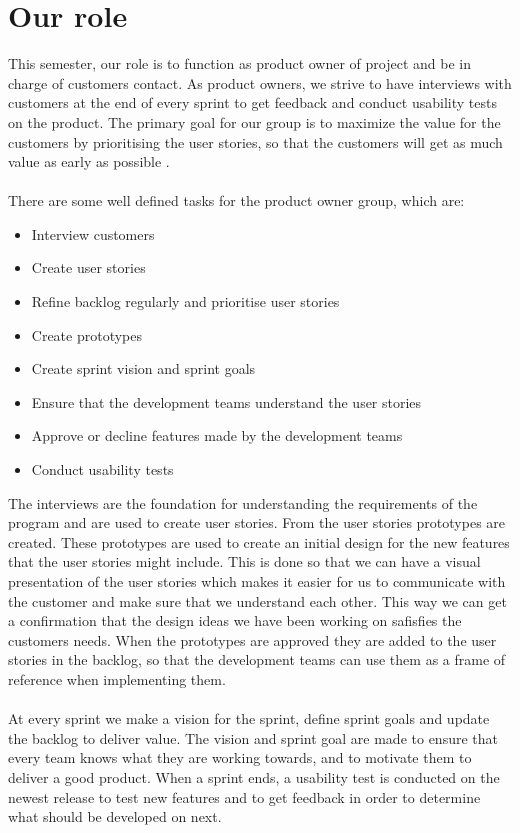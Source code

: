 \section{Our role}
This semester, our role is to function as product owner of project and be in charge of customers contact.
As product owners, we strive to have interviews with customers at the end of every sprint to get feedback and conduct usability tests on the product.
The primary goal for our group is to maximize the value for the customers by prioritising the user stories, so that the customers will get as much value as early as possible \autocite{TheScrumGuide}.\\
\\
There are some well defined tasks for the product owner group, which are:
\begin{itemize}
    \item Interview customers
    \item Create user stories    
    \item Refine backlog regularly and prioritise user stories
    \item Create prototypes
    \item Create sprint vision and sprint goals
    \item Ensure that the development teams understand the user stories
    \item Approve or decline features made by the development teams
    \item Conduct usability tests
\end{itemize}
\noindent
The interviews are the foundation for understanding the requirements of the program and are used to create user stories. 
From the user stories prototypes are created.
These prototypes are used to create an initial design for the new features that the user stories might include. This is done so that we can have a visual presentation of the user stories which makes it easier for us to communicate with the customer and make sure that we understand each other. This way we can get a confirmation that the design ideas we have been working on safisfies the customers needs.
When the prototypes are approved they are added to the user stories in the backlog, so that the development teams can use them as a frame of reference when implementing them.
\\\\
At every sprint we make a vision for the sprint, define sprint goals and update the backlog to deliver value. 
The vision and sprint goal are made to ensure that every team knows what they are working towards, and to motivate them to deliver a good product.
When a sprint ends, a usability test is conducted on the newest release to test new features and to get feedback in order to determine what should be developed on next.
